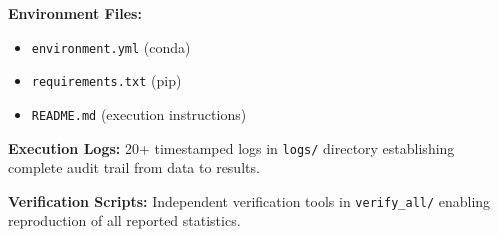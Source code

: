 \documentclass[11pt]{article}
\begin{document}
\textbf{Environment Files:}
\begin{itemize}
\item \texttt{environment.yml} (conda)
\item \texttt{requirements.txt} (pip)
\item \texttt{README.md} (execution instructions)
\end{itemize}

\textbf{Execution Logs:} 20+ timestamped logs in \texttt{logs/} directory establishing complete audit trail from data to results.

\textbf{Verification Scripts:} Independent verification tools in \texttt{verify\_all/} enabling reproduction of all reported statistics.
\end{document}
